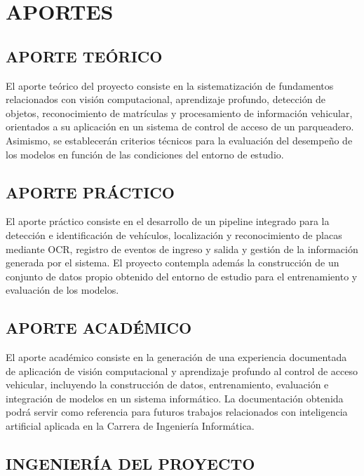 \section*{APORTES}

\subsection*{APORTE TEÓRICO}

El aporte teórico del proyecto consiste en la sistematización de fundamentos
relacionados con visión computacional, aprendizaje profundo, detección de
objetos, reconocimiento de matrículas y procesamiento de información vehicular,
orientados a su aplicación en un sistema de control de acceso de un parqueadero.
Asimismo, se establecerán criterios técnicos para la evaluación del desempeño de
los modelos en función de las condiciones del entorno de estudio.

\subsection*{APORTE PRÁCTICO}

El aporte práctico consiste en el desarrollo de un pipeline integrado para la
detección e identificación de vehículos, localización y reconocimiento de placas
mediante OCR, registro de eventos de ingreso y salida y gestión de la información
generada por el sistema. El proyecto contempla además la construcción de un
conjunto de datos propio obtenido del entorno de estudio para el entrenamiento y
evaluación de los modelos.

\subsection*{APORTE ACADÉMICO}

El aporte académico consiste en la generación de una experiencia documentada de
aplicación de visión computacional y aprendizaje profundo al control de acceso
vehicular, incluyendo la construcción de datos, entrenamiento, evaluación e
integración de modelos en un sistema informático. La documentación obtenida
podrá servir como referencia para futuros trabajos relacionados con inteligencia
artificial aplicada en la Carrera de Ingeniería Informática.

\subsection*{INGENIERÍA DEL PROYECTO}

